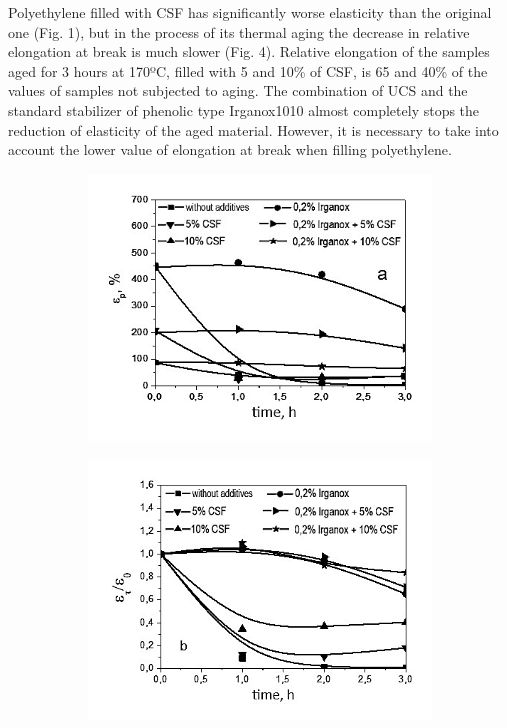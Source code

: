 \begin{multicols}{2}
Polyethylene filled with CSF has significantly worse elasticity than the
original one (Fig. 1), but in the process of its thermal aging the
decrease in relative elongation at break is much slower (Fig. 4).
Relative elongation of the samples aged for 3 hours at 170ºC, filled
with 5 and 10\% of CSF, is 65 and 40\% of the values of samples not
subjected to aging. The combination of UCS and the standard stabilizer
of phenolic type Irganox1010 almost completely stops the reduction of
elasticity of the aged material. However, it is necessary to take into
account the lower value of elongation at break when filling
polyethylene.
\end{multicols}

\begin{figure}[H]
    \centering
    \begin{subfigure}[t]{0.4\textwidth} %
        \centering
        \includegraphics[width=\textwidth]{media/chem/image24}
    \end{subfigure}
    \hspace{0.05\textwidth} %
    \begin{subfigure}[t]{0.4\textwidth} %
        \centering
        \includegraphics[width=\textwidth]{media/chem/image25}

\end{subfigure}
\end{figure}
